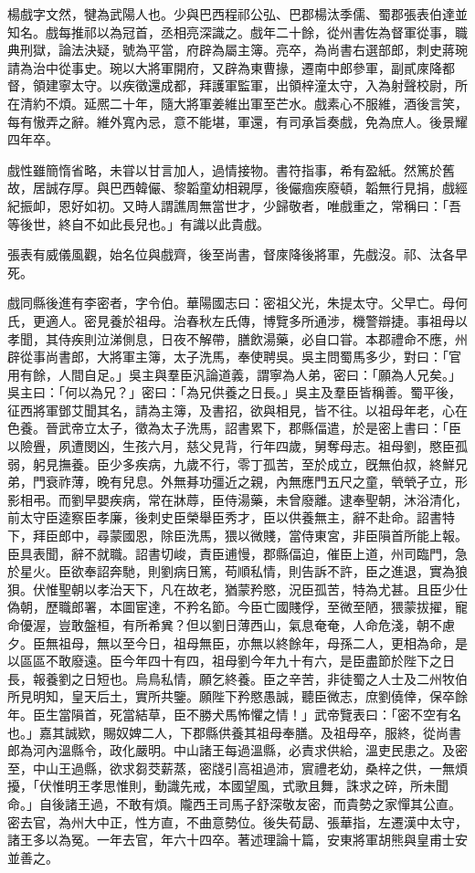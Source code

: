 
\begin{pinyinscope}
楊戲字文然，犍為武陽人也。少與巴西程祁公弘、巴郡楊汰季儒、蜀郡張表伯達並知名。戲每推祁以為冠首，丞相亮深識之。戲年二十餘，從州書佐為督軍從事，職典刑獄，論法決疑，號為平當，府辟為屬主簿。亮卒，為尚書右選部郎，刺史蔣琬請為治中從事史。琬以大將軍開府，又辟為東曹掾，遷南中郎參軍，副貳庲降都督，領建寧太守。以疾徵還成都，拜護軍監軍，出領梓潼太守，入為射聲校尉，所在清約不煩。延熈二十年，隨大將軍姜維出軍至芒水。戲素心不服維，酒後言笑，每有慠弄之辭。維外寬內忌，意不能堪，軍還，有司承旨奏戲，免為庶人。後景耀四年卒。

戲性雖簡惰省略，未甞以甘言加人，過情接物。書符指事，希有盈紙。然篤於舊故，居誠存厚。與巴西韓儼、黎韜童幼相親厚，後儼痼疾廢頓，韜無行見捐，戲經紀振卹，恩好如初。又時人謂譙周無當世才，少歸敬者，唯戲重之，常稱曰：「吾等後世，終自不如此長兒也。」有識以此貴戲。

張表有威儀風觀，始名位與戲齊，後至尚書，督庲降後將軍，先戲沒。祁、汰各早死。

戲同縣後進有李密者，字令伯。華陽國志曰：密祖父光，朱提太守。父早亡。母何氏，更適人。密見養於祖母。治春秋左氏傳，博覽多所通涉，機警辯捷。事祖母以孝聞，其侍疾則泣涕側息，日夜不解帶，膳飲湯藥，必自口甞。本郡禮命不應，州辟從事尚書郎，大將軍主簿，太子洗馬，奉使聘吳。吳主問蜀馬多少，對曰：「官用有餘，人間自足。」吳主與羣臣汎論道義，謂寧為人弟，密曰：「願為人兄矣。」吳主曰：「何以為兄？」密曰：「為兄供養之日長。」吳主及羣臣皆稱善。蜀平後，征西將軍鄧艾聞其名，請為主簿，及書招，欲與相見，皆不往。以祖母年老，心在色養。晉武帝立太子，徵為太子洗馬，詔書累下，郡縣偪遣，於是密上書曰：「臣以險舋，夙遭閔凶，生孩六月，慈父見背，行年四歲，舅奪母志。祖母劉，愍臣孤弱，躬見撫養。臣少多疾病，九歲不行，零丁孤苦，至於成立，旣無伯叔，終鮮兄弟，門衰祚薄，晚有兒息。外無朞功彊近之親，內無應門五尺之童，煢煢孑立，形影相弔。而劉早嬰疾病，常在牀蓐，臣侍湯藥，未曾廢離。逮奉聖朝，沐浴清化，前太守臣逵察臣孝廉，後刺史臣榮舉臣秀才，臣以供養無主，辭不赴命。詔書特下，拜臣郎中，尋蒙國恩，除臣洗馬，猥以微賤，當侍東宮，非臣隕首所能上報。臣具表聞，辭不就職。詔書切峻，責臣逋慢，郡縣偪迫，催臣上道，州司臨門，急於星火。臣欲奉詔奔馳，則劉病日篤，苟順私情，則告訴不許，臣之進退，實為狼狽。伏惟聖朝以孝治天下，凡在故老，猶蒙矜愍，況臣孤苦，特為尤甚。且臣少仕偽朝，歷職郎署，本圖宦達，不矜名節。今臣亡國賤俘，至微至陋，猥蒙拔擢，寵命優渥，豈敢盤桓，有所希兾？但以劉日薄西山，氣息奄奄，人命危淺，朝不慮夕。臣無祖母，無以至今日，祖母無臣，亦無以終餘年，母孫二人，更相為命，是以區區不敢廢遠。臣今年四十有四，祖母劉今年九十有六，是臣盡節於陛下之日長，報養劉之日短也。烏鳥私情，願乞終養。臣之辛苦，非徒蜀之人士及二州牧伯所見明知，皇天后土，實所共鑒。願陛下矜愍愚誠，聽臣微志，庶劉僥倖，保卒餘年。臣生當隕首，死當結草，臣不勝犬馬怖懼之情！」武帝覽表曰：「密不空有名也。」嘉其誠欵，賜奴婢二人，下郡縣供養其祖母奉膳。及祖母卒，服終，從尚書郎為河內溫縣令，政化嚴明。中山諸王每過溫縣，必責求供給，溫吏民患之。及密至，中山王過縣，欲求芻茭薪蒸，密牋引高祖過沛，賔禮老幼，桑梓之供，一無煩擾，「伏惟明王孝思惟則，動識先戒，本國望風，式歌且舞，誅求之碎，所未聞命。」自後諸王過，不敢有煩。隴西王司馬子舒深敬友密，而貴勢之家憚其公直。密去官，為州大中正，性方直，不曲意勢位。後失荀勗、張華指，左遷漢中太守，諸王多以為冤。一年去官，年六十四卒。著述理論十篇，安東將軍胡熊與皇甫士安並善之。


\end{pinyinscope}
